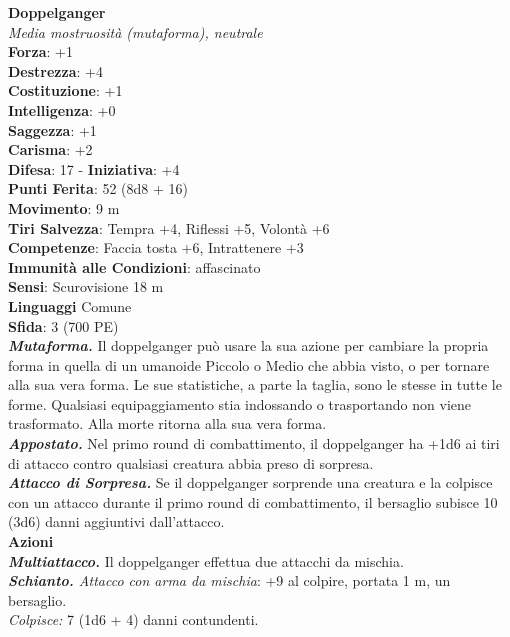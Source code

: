 \begin{multicols}{2}
\medskip\textbf{Doppelganger}\\
\emph{Media mostruosità (mutaforma), neutrale}\\
\textbf{Forza}: +1\\
\textbf{Destrezza}: +4\\
\textbf{Costituzione}: +1\\
\textbf{Intelligenza}: +0\\
\textbf{Saggezza}: +1\\
\textbf{Carisma}: +2\\
\textbf{Difesa}: 17 - \textbf{Iniziativa}: +4\\
\textbf{Punti Ferita}: 52 (8d8 + 16)\\
\textbf{Movimento}: 9 m\\
\textbf{Tiri Salvezza}: Tempra +4, Riflessi +5, Volontà +6\\
\textbf{Competenze}: Faccia tosta +6, Intrattenere +3\\
\textbf{Immunità alle Condizioni}: affascinato\\
\textbf{Sensi}: Scurovisione 18 m\\
\textbf{Linguaggi} Comune\\
\textbf{Sfida}: 3 (700 PE)\smallskip\\
\emph{\textbf{Mutaforma.}} Il doppelganger può usare la sua azione per cambiare la propria forma in quella di un umanoide Piccolo o Medio che abbia visto, o per tornare alla sua vera forma. Le sue statistiche, a parte la taglia, sono le stesse in tutte le forme. Qualsiasi equipaggiamento stia indossando o trasportando non viene trasformato.  Alla morte ritorna alla sua vera forma.\\
\emph{\textbf{Appostato.}} Nel primo round di combattimento, il doppelganger ha +1d6 ai tiri di attacco contro qualsiasi creatura abbia preso di sorpresa.\\
\emph{\textbf{Attacco di Sorpresa.}} Se il doppelganger sorprende una creatura e la colpisce con un attacco durante il primo round di combattimento, il bersaglio subisce 10 (3d6) danni aggiuntivi dall'attacco.\\
\smallskip\textbf{Azioni}\\
\emph{\textbf{Multiattacco.}} Il doppelganger effettua due attacchi da mischia.\\
\emph{\textbf{Schianto.} Attacco con arma da mischia}: +9 al colpire, portata 1 m, un bersaglio.\\
\emph{Colpisce:} 7 (1d6 + 4) danni contundenti.\\

\end{multicols}
